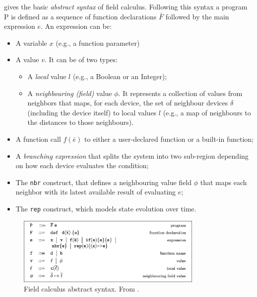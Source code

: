 \documentclass[12pt,a4paper,openright,twoside]{book}
\begin{document}
 gives the basic \emph{abstract syntax} of field calculus. Following this syntax 
    a program P is defined as a sequence of function declarations $\bar{F}$ followed by the main 
    expression $e$. An expression can be: 
    \begin{itemize}
        \item A variable $x$ (e.g., a function parameter)
        \item A value $v$. It can be of two types:
        \begin{itemize}
            \item A \emph{local} value $l$ (e.g., a Boolean or an Integer);
            \item A \emph{neighbouring (field)} value $\phi$. It represents a collection of values 
                from neighbors that maps, for each device, the set of neighbour devices $\delta$
                (including the device itself) to local values $l$ (e.g., a map of neighbours to the distances 
                to those neighbours).
        \end{itemize}
        \item A function call $f(\bar{e})$ to either a user-declared function or a built-in function;
        \item A \emph{branching expression} that splits the system into two sub-region depending on 
            how each device evaluates the condition;
        \item The \texttt{nbr} construct, that defines a neighbouring value field $\phi$ that maps 
            each neighbor with its latest available result of evaluating $e$;
        \item The \texttt{rep} construct, which models state evolution over time.
    \end{itemize}

    \begin{figure}[t]
        \centering
        \includegraphics[width=0.8\textwidth]{figures/FC-abstract-syntax.png}
        \caption{Field calculus abstract syntax. From \cite{fieldcalculus}.}
        \label{fig:fc-syntax}
    \end{figure}
\end{document}
